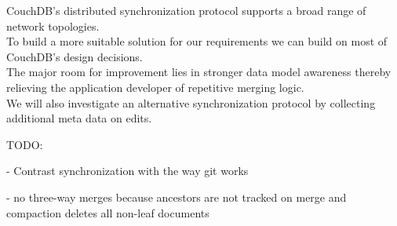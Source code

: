 CouchDB's distributed synchronization protocol supports a broad range of network topologies.\\

To build a more suitable solution for our requirements we can build on most of CouchDB's design decisions.\\
The major room for improvement lies in stronger data model awareness thereby relieving the application developer of repetitive merging logic.\\
We will also investigate an alternative synchronization protocol by collecting additional meta data on edits.

TODO:

- Contrast synchronization with the way git works

- no three-way merges because ancestors are not tracked on merge and compaction deletes all non-leaf documents
